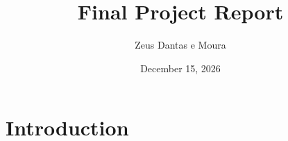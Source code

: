 \documentclass{scrartcl}
\title{Final Project Report}
\author{Zeus Dantas e Moura}
\date{December 15, 2026}
\begin{document}
\maketitle

\section{Introduction}
\end{document}
